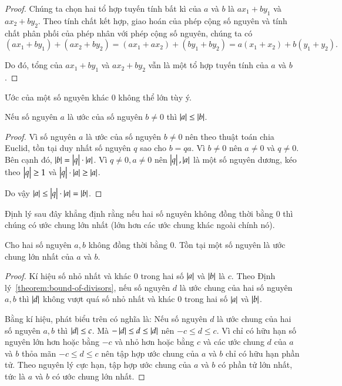 \begin{proof}
	Chúng ta chọn hai tổ hợp tuyến tính bất kì của $a$ và $b$ là $ax_{1} + by_{1}$ và $ax_{2} + by_{2}$. Theo tính chất kết hợp, giao hoán của phép cộng số nguyên và tính chất phân phối của phép nhân với phép cộng số nguyên, chúng ta có
	\[
		(ax_{1} + by_{1}) + (ax_{2} + by_{2}) = (ax_{1} + ax_{2}) + (by_{1} + by_{2}) = a(x_{1} + x_{2}) + b(y_{1} + y_{2}).
	\]

	Do đó, tổng của $ax_{1} + by_{1}$ và $ax_{2} + by_{2}$ vẫn là một tổ hợp tuyến tính của $a$ và $b$.
\end{proof}

Ước của một số nguyên khác $0$ không thể lớn tùy ý.
\begin{theorem}\label{theorem:bound-of-divisors}
	Nếu số nguyên $a$ là ước của số nguyên $b\ne 0$ thì $\left\vert{a}\right\vert\leq \left\vert{b}\right\vert$.
\end{theorem}

\begin{proof}
	Vì số nguyên $a$ là ước của số nguyên $b\ne 0$ nên theo thuật toán chia Euclid, tồn tại duy nhất số nguyên $q$ sao cho $b = qa$. Vì $b\ne 0$ nên $a\ne 0$ và $q\ne 0$. Bên cạnh đó, $\left\vert{b}\right\vert = \left\vert{q}\right\vert\cdot\left\vert{a}\right\vert$. Vì $q\ne 0, a\ne 0$ nên $\left\vert{q}\right\vert, \left\vert{a}\right\vert$ là một số nguyên dương, kéo theo $\left\vert{q}\right\vert\geq 1$ và $\left\vert{q}\right\vert\cdot\left\vert{a}\right\vert \geq \left\vert{a}\right\vert$.

	Do vậy $\left\vert{a}\right\vert\leq \left\vert{q}\right\vert\cdot\left\vert{a}\right\vert = \left\vert{b}\right\vert$.
\end{proof}

Định lý sau đây khẳng định rằng nếu hai số nguyên không đồng thời bằng $0$ thì chúng có ước chung lớn nhất (lớn hơn các ước chung khác ngoài chính nó).
\begin{theorem}
	Cho hai số nguyên $a, b$ không đồng thời bằng $0$. Tồn tại một số nguyên là ước chung lớn nhất của $a$ và $b$.
\end{theorem}

\begin{proof}
	Kí hiệu số nhỏ nhất và khác $0$ trong hai số $\left\vert{a}\right\vert$ và $\left\vert{b}\right\vert$ là $c$. Theo Định lý~\ref{theorem:bound-of-divisors}, nếu số nguyên $d$ là ước chung của hai số nguyên $a, b$ thì $\left\vert{d}\right\vert$ không vượt quá số nhỏ nhất và khác $0$ trong hai số $\left\vert{a}\right\vert$ và $\left\vert{b}\right\vert$.

	Bằng kí hiệu, phát biểu trên có nghĩa là: Nếu số nguyên $d$ là ước chung của hai số nguyên $a, b$ thì $\left\vert{d}\right\vert\leq c$. Mà $-\left\vert{d}\right\vert\leq d \leq \left\vert{d}\right\vert$ nên $-c\leq d\leq c$. Vì chỉ có hữu hạn số nguyên lớn hơn hoặc bằng $-c$ và nhỏ hơn hoặc bằng $c$ và các ước chung $d$ của $a$ và $b$ thỏa mãn $-c\leq d\leq c$ nên tập hợp ước chung của $a$ và $b$ chỉ có hữu hạn phần tử. Theo nguyên lý cực hạn, tập hợp ước chung của $a$ và $b$ có phần tử lớn nhất, tức là $a$ và $b$ có ước chung lớn nhất.
\end{proof}

